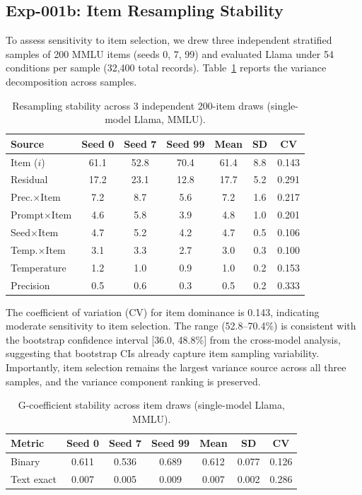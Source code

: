 \documentclass[letterpaper]{article}
\begin{document}
\subsection{Exp-001b: Item Resampling Stability}
\label{sec:exp001b}

To assess sensitivity to item selection, we drew three independent stratified samples of 200 MMLU items (seeds 0, 7, 99) and evaluated Llama under 54 conditions per sample (32,400 total records).
Table~\ref{tab:resampling} reports the variance decomposition across samples.

\begin{table}[t]
\centering
\caption{Resampling stability across 3 independent 200-item draws (single-model Llama, MMLU).}
\label{tab:resampling}
\begin{tabular}{lcccccc}
\toprule
Source & Seed 0 & Seed 7 & Seed 99 & Mean & SD & CV \\
\midrule
Item ($i$)         & 61.1 & 52.8 & 70.4 & 61.4 & 8.8 & 0.143 \\
Residual           & 17.2 & 23.1 & 12.8 & 17.7 & 5.2 & 0.291 \\
Prec.$\times$Item  & 7.2  & 8.7  & 5.6  & 7.2  & 1.6 & 0.217 \\
Prompt$\times$Item & 4.6  & 5.8  & 3.9  & 4.8  & 1.0 & 0.201 \\
Seed$\times$Item   & 4.7  & 5.2  & 4.2  & 4.7  & 0.5 & 0.106 \\
Temp.$\times$Item  & 3.1  & 3.3  & 2.7  & 3.0  & 0.3 & 0.100 \\
Temperature        & 1.2  & 1.0  & 0.9  & 1.0  & 0.2 & 0.153 \\
Precision          & 0.5  & 0.6  & 0.3  & 0.5  & 0.2 & 0.333 \\
\bottomrule
\end{tabular}
\end{table}

The coefficient of variation (CV) for item dominance is 0.143, indicating moderate sensitivity to item selection.
The range (52.8--70.4\%) is consistent with the bootstrap confidence interval [36.0, 48.8\%] from the cross-model analysis, suggesting that bootstrap CIs already capture item sampling variability.
Importantly, item selection remains the largest variance source across all three samples, and the variance component ranking is preserved.

\begin{table}[t]
\centering
\caption{G-coefficient stability across item draws (single-model Llama, MMLU).}
\label{tab:g_stability}
\begin{tabular}{lcccccc}
\toprule
Metric & Seed 0 & Seed 7 & Seed 99 & Mean & SD & CV \\
\midrule
Binary       & 0.611 & 0.536 & 0.689 & 0.612 & 0.077 & 0.126 \\
Text exact   & 0.007 & 0.005 & 0.009 & 0.007 & 0.002 & 0.286 \\
\bottomrule
\end{tabular}
\end{table}
\end{document}
